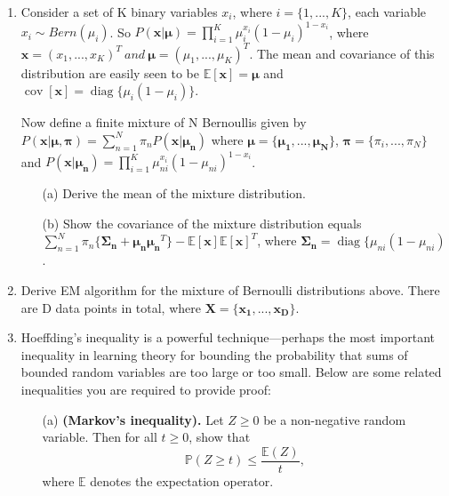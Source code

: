 \documentclass[10pt]{article}
\begin{document}
\begin{enumerate}[1.]
		\item Consider a set of K binary variables $x_i$, where $i=\{1,...,K\}$, each variable $x_i\sim Bern(\mu_i)$. So $P(\mathbf{x}|\boldsymbol{\mu})=\prod_{i=1}^{K}\mu_i^{x_i}(1-\mu_i)^{1-x_i}$, where $\mathbf{x}=(x_1,...,x_K)^T\ and\ \boldsymbol{\mu}=(\mu_1,...,\mu_K)^T$. The mean and covariance of this distribution are easily seen to be $\mathbb{E}[\mathbf{x}] =\boldsymbol{\mu}$ and $\operatorname{cov}[\mathbf{x}]=\operatorname{diag}\{\mu_{i}(1-\mu_{i})\}$.
		
		Now define a finite mixture of N Bernoullis given by $P(\mathbf{x}|\boldsymbol{\mu},\boldsymbol{\pi})=\sum_{n=1}^{N}\pi_nP(\mathbf{x}|\boldsymbol{\mu_n})$ where $\boldsymbol{\mu}=\{\boldsymbol{\mu_1},...,\boldsymbol{\mu_N}\}$, $\boldsymbol{\pi}=\{\pi_i,...,\pi_N\}$ and $P(\mathbf{x}|\boldsymbol{\mu_n})=\prod_{i=1}^{K}\mu_{ni}^{x_i}(1-\mu_{ni})^{1-x_i}$.\\
			\begin{itemize}
				\item[(a)] Derive the mean of the mixture distribution.~
				
				\item[(b)] Show the covariance of the mixture distribution equals $\sum_{n=1}^{N}\pi_n\{\boldsymbol{\Sigma_n}+\boldsymbol{\mu_n}\boldsymbol{\mu_n}^T\}-\mathbb{E}[\mathbf{x}]\mathbb{E}[\mathbf{x}]^T$, where $\boldsymbol{\Sigma_n}=\operatorname{diag}\{\mu_{ni}(1-\mu_{ni})$.~
			\end{itemize}

	
		\item Derive EM algorithm for the mixture of Bernoulli distributions above. There are D data points in total, where $\mathbf{X}=\{\mathbf{x_1},...,\mathbf{x_D}\}$.~
		
		\item  Hoeffding’s inequality is a powerful technique—perhaps the most important inequality in learning theory for bounding the probability that sums of bounded random variables are too large or too small. Below are some related inequalities you are required to provide proof:
			\begin{itemize}
				\item[(a)] \textbf{(Markov's inequality).} Let $Z \geq 0$ be a non-negative random variable. Then for all $t\geq 0$, show that
					\begin{equation}
						\mathbb{P} (Z\geq t) \leq \frac{\mathbb{E}(Z)}{t},
					\end{equation}
					where $\mathbb{E}$ denotes the expectation operator.~ 
					

\end{itemize}
\end{enumerate}
\end{document}
